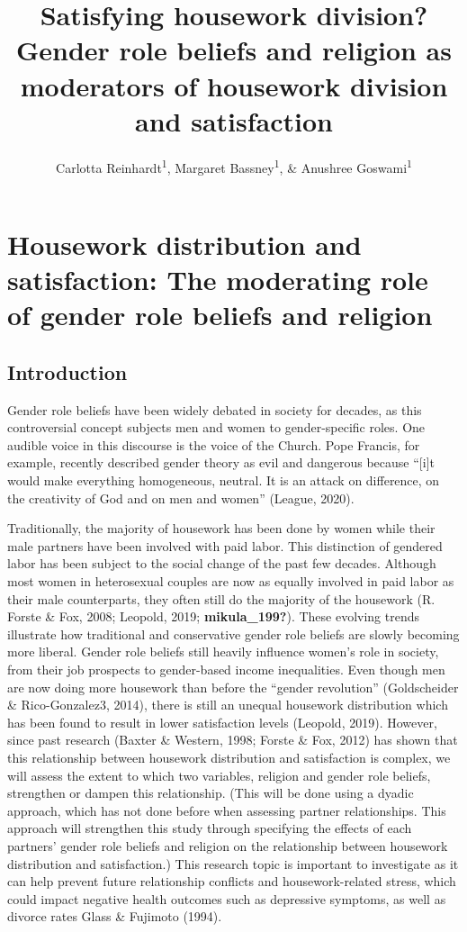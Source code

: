 \documentclass[
  man,floatsintext]{apa6}
\title{Satisfying housework division? Gender role beliefs and religion as moderators of housework division and satisfaction}
\author{Carlotta Reinhardt\textsuperscript{1}, Margaret Bassney\textsuperscript{1}, \& Anushree Goswami\textsuperscript{1}}
\date{}
\affiliation{\vspace{0.5cm}\textsuperscript{1} Smith College}
\begin{document}
\maketitle

\hypertarget{housework-distribution-and-satisfaction-the-moderating-role-of-gender-role-beliefs-and-religion}{%
\section{Housework distribution and satisfaction: The moderating role of gender role beliefs and religion}\label{housework-distribution-and-satisfaction-the-moderating-role-of-gender-role-beliefs-and-religion}}

\hypertarget{introduction}{%
\subsection{Introduction}\label{introduction}}

Gender role beliefs have been widely debated in society for decades, as this controversial concept subjects men and women to gender-specific roles. One audible voice in this discourse is the voice of the Church. Pope Francis, for example, recently described gender theory as evil and dangerous because ``{[}i{]}t would make everything homogeneous, neutral. It is an attack on difference, on the creativity of God and on men and women'' (League, 2020).

Traditionally, the majority of housework has been done by women while their male partners have been involved with paid labor. This distinction of gendered labor has been subject to the social change of the past few decades. Although most women in heterosexual couples are now as equally involved in paid labor as their male counterparts, they often still do the majority of the housework (R. Forste \& Fox, 2008; Leopold, 2019; \textbf{mikula\_199?}). These evolving trends illustrate how traditional and conservative gender role beliefs are slowly becoming more liberal. Gender role beliefs still heavily influence women's role in society, from their job prospects to gender-based income inequalities. Even though men are now doing more housework than before the ``gender revolution'' (Goldscheider \& Rico-Gonzalez3, 2014), there is still an unequal housework distribution which has been found to result in lower satisfaction levels (Leopold, 2019). However, since past research (Baxter \& Western, 1998; Forste \& Fox, 2012) has shown that this relationship between housework distribution and satisfaction is complex, we will assess the extent to which two variables, religion and gender role beliefs, strengthen or dampen this relationship.
(This will be done using a dyadic approach, which has not done before when assessing partner relationships. This approach will strengthen this study through specifying the effects of each partners' gender role beliefs and religion on the relationship between housework distribution and satisfaction.)
This research topic is important to investigate as it can help prevent future relationship conflicts and housework-related stress, which could impact negative health outcomes such as depressive symptoms, as well as divorce rates Glass \& Fujimoto (1994).
\end{document}
